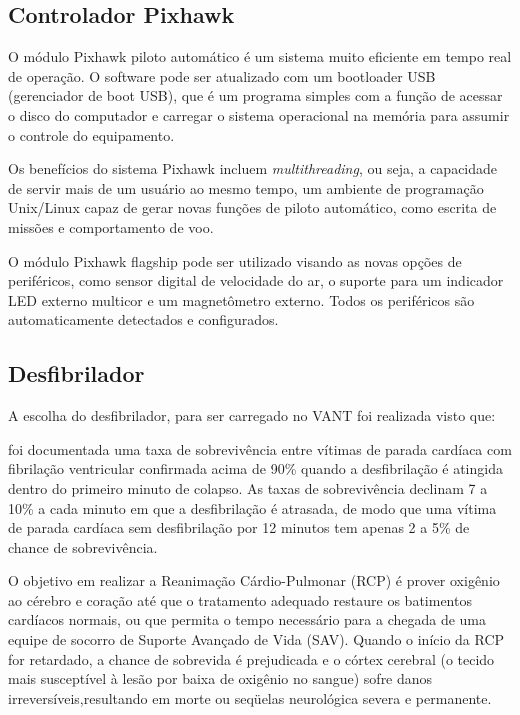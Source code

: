 \subsection{Controlador Pixhawk}
O módulo Pixhawk piloto automático é um sistema muito eficiente em tempo real de operação. 
O software pode ser atualizado com um bootloader USB (gerenciador de boot USB), que é um programa simples com a 
função de acessar o disco do computador e carregar o sistema operacional na memória para assumir o controle do 
equipamento.

Os benefícios do sistema Pixhawk incluem \textit{multithreading}, ou seja, a capacidade de servir mais de um usuário ao 
mesmo tempo, um ambiente de programação Unix/Linux capaz de gerar novas funções de piloto automático, como 
escrita de missões e comportamento de voo. \cite{pix}
 
O módulo Pixhawk flagship pode ser utilizado visando as novas opções de periféricos, como sensor digital de velocidade do ar, o suporte para um indicador LED externo multicor e um magnetômetro externo. Todos os periféricos são automaticamente detectados e configurados. \cite{pix}

\subsection{Desfibrilador}

A escolha do desfibrilador, para ser carregado no VANT foi realizada visto que:

\begin{citacao}
foi documentada uma taxa de 
sobrevivência entre vítimas de parada cardíaca com fibrilação ventricular confirmada acima de 90\% quando a desfibrilação é atingida
dentro do primeiro minuto de colapso. As taxas de sobrevivência declinam 7 a 10\% a cada minuto em que a desfibrilação
é atrasada, de modo que uma vítima de parada cardíaca sem desfibrilação por 12 minutos tem apenas 2 a 5\%
de chance de sobrevivência.\cite{1}
\end{citacao}

O objetivo em realizar a Reanimação Cárdio-Pulmonar (RCP) é prover oxigênio ao cérebro e coração até que
o tratamento adequado restaure os batimentos cardíacos normais, ou que permita o tempo necessário para a 
chegada de uma equipe de socorro de Suporte Avançado de Vida (SAV). Quando o início da RCP for retardado, 
a chance de sobrevida é prejudicada e o córtex cerebral (o tecido mais susceptível à lesão por baixa de 
oxigênio no sangue) sofre danos irreversíveis,resultando em morte ou seqüelas neurológica severa e permanente. \cite{2}

